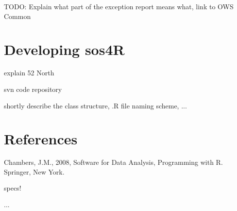\documentclass{article}
\begin{document}
TODO: Explain what part of the exception report means what, link to OWS Common


%

\section{Developing sos4R}

explain 52 North

svn code repository

shortly describe the class structure, .R file naming scheme, ...

\section*{References}
\begin{description}
\item Chambers, J.M., 2008, Software for Data Analysis, Programming with R.
Springer, New York.
\item specs!
\item ...
\end{description}
\end{document}

